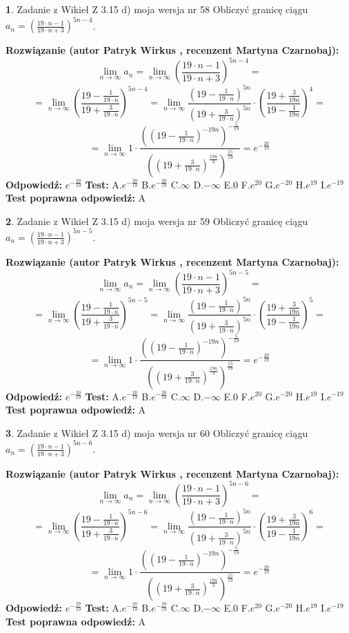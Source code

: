 \documentclass[12pt, a4paper]{article}
\theoremstyle{definition} %
\newtheorem{zad}{}
\newcommand{\zadStart}[1]{\begin{zad}#1\newline}
\newcommand{\zadStop}{\end{zad}}
\newcommand{\rozwStart}[2]{\noindent \textbf{Rozwiązanie (autor #1 , recenzent #2): }\newline}
\newcommand{\rozwStop}{\newline}
\newcommand{\odpStart}{\noindent \textbf{Odpowiedź:}\newline}
\newcommand{\odpStop}{\newline}
\newcommand{\testStart}{\noindent \textbf{Test:}\newline}
\newcommand{\testStop}{\newline}
\newcommand{\kluczStart}{\noindent \textbf{Test poprawna odpowiedź:}\newline}
\newcommand{\kluczStop}{\newline}
\begin{document}
\zadStart{Zadanie z Wikieł Z 3.15 d) moja wersja nr 58}
Obliczyć granicę ciągu $a_{n}=(\frac{19\cdot n - 1}{19 \cdot n + 3})^{5n-4}$.
\zadStop
\rozwStart{Patryk Wirkus}{Martyna Czarnobaj}
$$\lim\limits_{n\to\infty} a_{n} = \lim\limits_{n\to\infty}(\frac{19\cdot n - 1}{19 \cdot n + 3})^{5n-4}=$$
$$=\lim\limits_{n\to\infty}(\frac{19 - \frac{1}{19\cdot n}}{19 + \frac{3}{19 \cdot n}})^{5n-4}=\lim\limits_{n\to\infty}\frac{(19 - \frac{1}{19\cdot n})^{5n}}{(19 + \frac{3}{19\cdot n})^{5n}} \cdot (\frac{19+\frac{3}{19n}}{19-\frac{1}{19n}})^{4}=$$
$$=\lim\limits_{n\to\infty} 1 \cdot \frac{((19-\frac{1}{19 \cdot n})^{-19n})^{-\frac{5}{19}}}{((19+\frac{3}{19 \cdot n})^{\frac{19n}{3}})^{\frac{15}{19}}} =e^{-\frac{20}{19}}$$
\rozwStop
\odpStart
$e^{-\frac{20}{19}}$
\odpStop
\testStart
A.$ e^{-\frac{20}{19}}$
B.$ e^{-\frac{20}{19}}$
C.$\infty$
D.$-\infty$
E.$0$
F.$e^{20}$
G.$e^{-20}$
H.$e^{19}$
I.$e^{-19}$
\testStop
\kluczStart
A
\kluczStop



\zadStart{Zadanie z Wikieł Z 3.15 d) moja wersja nr 59}
Obliczyć granicę ciągu $a_{n}=(\frac{19\cdot n - 1}{19 \cdot n + 3})^{5n-5}$.
\zadStop
\rozwStart{Patryk Wirkus}{Martyna Czarnobaj}
$$\lim\limits_{n\to\infty} a_{n} = \lim\limits_{n\to\infty}(\frac{19\cdot n - 1}{19 \cdot n + 3})^{5n-5}=$$
$$=\lim\limits_{n\to\infty}(\frac{19 - \frac{1}{19\cdot n}}{19 + \frac{3}{19 \cdot n}})^{5n-5}=\lim\limits_{n\to\infty}\frac{(19 - \frac{1}{19\cdot n})^{5n}}{(19 + \frac{3}{19\cdot n})^{5n}} \cdot (\frac{19+\frac{3}{19n}}{19-\frac{1}{19n}})^{5}=$$
$$=\lim\limits_{n\to\infty} 1 \cdot \frac{((19-\frac{1}{19 \cdot n})^{-19n})^{-\frac{5}{19}}}{((19+\frac{3}{19 \cdot n})^{\frac{19n}{3}})^{\frac{15}{19}}} =e^{-\frac{20}{19}}$$
\rozwStop
\odpStart
$e^{-\frac{20}{19}}$
\odpStop
\testStart
A.$ e^{-\frac{20}{19}}$
B.$ e^{-\frac{20}{19}}$
C.$\infty$
D.$-\infty$
E.$0$
F.$e^{20}$
G.$e^{-20}$
H.$e^{19}$
I.$e^{-19}$
\testStop
\kluczStart
A
\kluczStop



\zadStart{Zadanie z Wikieł Z 3.15 d) moja wersja nr 60}
Obliczyć granicę ciągu $a_{n}=(\frac{19\cdot n - 1}{19 \cdot n + 3})^{5n-6}$.
\zadStop
\rozwStart{Patryk Wirkus}{Martyna Czarnobaj}
$$\lim\limits_{n\to\infty} a_{n} = \lim\limits_{n\to\infty}(\frac{19\cdot n - 1}{19 \cdot n + 3})^{5n-6}=$$
$$=\lim\limits_{n\to\infty}(\frac{19 - \frac{1}{19\cdot n}}{19 + \frac{3}{19 \cdot n}})^{5n-6}=\lim\limits_{n\to\infty}\frac{(19 - \frac{1}{19\cdot n})^{5n}}{(19 + \frac{3}{19\cdot n})^{5n}} \cdot (\frac{19+\frac{3}{19n}}{19-\frac{1}{19n}})^{6}=$$
$$=\lim\limits_{n\to\infty} 1 \cdot \frac{((19-\frac{1}{19 \cdot n})^{-19n})^{-\frac{5}{19}}}{((19+\frac{3}{19 \cdot n})^{\frac{19n}{3}})^{\frac{15}{19}}} =e^{-\frac{20}{19}}$$
\rozwStop
\odpStart
$e^{-\frac{20}{19}}$
\odpStop
\testStart
A.$ e^{-\frac{20}{19}}$
B.$ e^{-\frac{20}{19}}$
C.$\infty$
D.$-\infty$
E.$0$
F.$e^{20}$
G.$e^{-20}$
H.$e^{19}$
I.$e^{-19}$
\testStop
\kluczStart
A
\kluczStop
\end{document}
